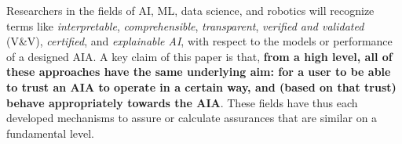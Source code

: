 
    Researchers in the fields of AI, ML, data science, and robotics will recognize terms like \emph{interpretable}, \emph{comprehensible}, \emph{transparent}, \emph{verified and validated} (V\&V), \emph{certified}, and \emph{explainable AI}, with respect to the models or performance of a designed AIA. A key claim of this paper is that, \textbf{from a high level, all of these approaches have the same underlying aim: for a user to be able to trust an AIA to operate in a certain way, and (based on that trust) behave appropriately towards the AIA}. These fields have thus each developed mechanisms to assure or calculate assurances that are similar on a fundamental level. 
